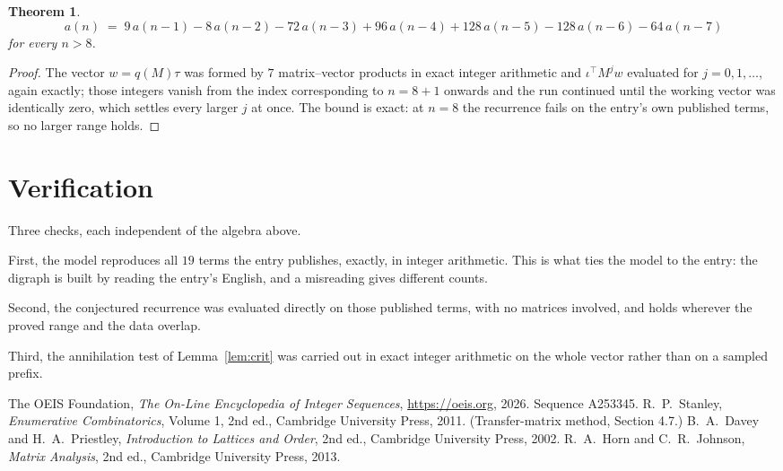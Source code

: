 \documentclass[11pt,a4paper]{article}
\theoremstyle{plain}
\newtheorem{theorem}{Theorem}
\theoremstyle{definition}
\begin{document}
\begin{theorem}
\[
a(n)\;=\;9\,a(n-1) - 8\,a(n-2) - 72\,a(n-3) + 96\,a(n-4) + 128\,a(n-5) - 128\,a(n-6) - 64\,a(n-7)
\]
for every $n>8$.
\end{theorem}

\begin{proof}
The vector $w=q(M)\tau$ was formed by $7$ matrix--vector products in exact integer
arithmetic and $\iota^{\!\top}M^{j}w$ evaluated for $j=0,1,\dots$, again exactly; those
integers vanish from the index corresponding to $n=8+1$ onwards and the run continued
until the working vector was identically zero, which settles every larger $j$ at once. The bound is exact: at $n=8$ the recurrence fails on the entry's own published terms, so no larger range holds.
\end{proof}

\section{Verification}

Three checks, each independent of the algebra above.

First, the model reproduces all $19$ terms the entry publishes, exactly, in integer
arithmetic. This is what ties the model to the entry: the digraph is built by reading the
entry's English, and a misreading gives different counts.

Second, the conjectured recurrence was evaluated directly on those published terms, with no
matrices involved, and holds wherever the proved range and the data overlap.

Third, the annihilation test of Lemma~\ref{lem:crit} was carried out in exact integer
arithmetic on the whole vector rather than on a sampled prefix.

\begin{thebibliography}{9}
 The OEIS Foundation, \emph{The On-Line Encyclopedia of Integer
Sequences}, \url{https://oeis.org}, 2026. Sequence A253345.
 R.~P.~Stanley, \emph{Enumerative Combinatorics}, Volume 1, 2nd ed.,
Cambridge University Press, 2011. (Transfer-matrix method, Section 4.7.)
 B.~A.~Davey and H.~A.~Priestley, \emph{Introduction to Lattices and
Order}, 2nd ed., Cambridge University Press, 2002.
 R.~A.~Horn and C.~R.~Johnson, \emph{Matrix Analysis}, 2nd ed., Cambridge
University Press, 2013.
\end{thebibliography}
\end{document}

